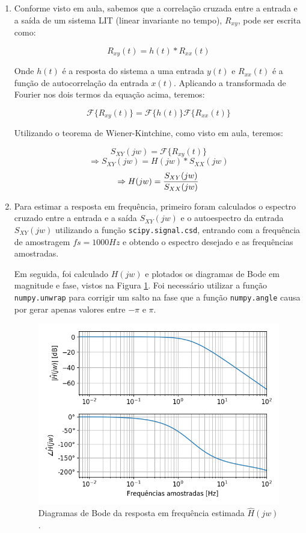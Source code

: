 \documentclass[12pt,letterpaper]{article}
\begin{document}
\begin{enumerate}[label=(\alph*)]  %
    \item Conforme visto em aula, sabemos que a correlação cruzada entre a entrada e a saída de um sistema LIT (linear invariante no tempo), ${R_{xy}}$, pode ser escrita como:

    
    $$
    R_{xy}(t) = h(t) * R_{xx}(t)
    $$
    
    Onde ${h(t)}$ é a resposta do sistema a uma entrada ${y(t)}$ e ${R_{xx}(t)}$ é a função de autocorrelação da entrada $x(t)$.
    Aplicando a transformada de Fourier nos dois termos da equação acima, teremos:
    
    $$
    \mathcal{F} \{R_{xy}(t)\} = \mathcal{F} \{h(t)\} \mathcal{F} \{R_{xx}(t)\}
    $$
    
    Utilizando o teorema de Wiener-Kintchine, como visto em aula, teremos:
    
    $$
    S_{XY}(jw) = \mathcal{F} \{R_{xy}(t)\}
    $$
    $$
    \Rightarrow
    S_{XY}(jw) = H(jw) * S_{XX}(jw)
    $$
    $$
    \Rightarrow H(jw) = {S_{XY}(jw) \over S_{XX}(jw)}
    $$

    \item
    Para estimar a resposta em frequência, primeiro foram calculados o espectro cruzado entre a entrada e a saída $S_{XY}(jw)$ e o autoespectro da entrada $S_{XY}(jw)$ utilizando a função \lstinline{scipy.signal.csd}, entrando com a frequência de amostragem $fs = 1000 Hz$ e obtendo o espectro desejado e as frequências amostradas.
    
    Em seguida, foi calculado $H(jw)$ e plotados os diagramas de Bode em magnitude e fase, vistos na Figura \ref{fig:bodeb}. Foi necessário utilizar a função \lstinline{numpy.unwrap} para corrigir um salto na fase que a função \lstinline{numpy.angle} causa por gerar apenas valores entre $-\pi$ e $\pi$.
            
        \begin{figure}[H]
            \centering
            \includegraphics[width=15cm]{TC2/images/bode_itemb.png}
            \caption{Diagramas de Bode da resposta em frequência estimada $\hat{H}(jw)$.}
            \label{fig:bodeb}
        \end{figure}
    

\end{enumerate}
\end{document}
